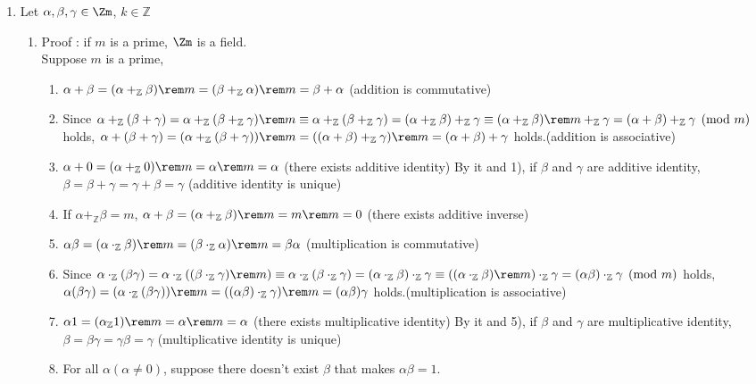 \documentclass{article}
\newcommand\Z{\mathbb Z}
\begin{document}
\begin{enumerate}[label=(\alph*)]
  \item  Let $\alpha,\beta,\gamma \in \Zm$, $k \in \mathbb{Z}$
    \begin{enumerate}[label = \arabic*']
    \item Proof : if $m$ is a prime, $\Zm$ is a field.\\
  Suppose $m$ is a prime,
\begin{enumerate}[label=\alph*)]
         \item  $\alpha + \beta = (\alpha +_\Z \beta) \rem m = (\beta +_\Z \alpha) \rem m = \beta + \alpha$ (addition is commutative)
         \item  Since $\alpha +_\Z (\beta + \gamma) = \alpha +_\Z (\beta +_\Z \gamma) \rem m \equiv \alpha +_\Z (\beta +_\Z \gamma) = (\alpha +_\Z \beta) +_\Z \gamma \equiv (\alpha +_\Z \beta) \rem m +_\Z \gamma = (\alpha + \beta) +_\Z \gamma \pmod m$ holds, $\alpha + (\beta + \gamma) = (\alpha +_\Z (\beta + \gamma)) \rem m  = ((\alpha + \beta) +_\Z \gamma) \rem m = (\alpha + \beta) + \gamma $ holds.(addition is associative)
         \item  $\alpha + 0 = (\alpha +_\Z 0) \rem m = \alpha \rem m = \alpha$ (there exists additive identity)  By it and 1), if $\beta$ and $\gamma$ are additive identity, $\beta = \beta + \gamma = \gamma + \beta = \gamma$ (additive identity is unique)
         \item  If $\alpha + _\Z\beta = m$, $\alpha + \beta = (\alpha + _\Z\beta) \rem m = m \rem m = 0$ (there exists additive inverse)
         \item  $\alpha\beta = (\alpha \cdot_\Z \beta) \rem m = (\beta \cdot_\Z \alpha) \rem m = \beta\alpha$ (multiplication is commutative)
         \item  Since $\alpha \cdot_\Z (\beta\gamma) = \alpha \cdot_\Z ((\beta \cdot_\Z \gamma) \rem m) \equiv \alpha \cdot_\Z (\beta \cdot_\Z \gamma) = (\alpha \cdot_\Z \beta) \cdot_\Z \gamma \equiv ((\alpha \cdot_\Z \beta) \rem m) \cdot_\Z \gamma = (\alpha\beta) \cdot_\Z \gamma \pmod m$ holds, $\alpha(\beta\gamma) = (\alpha \cdot_\Z (\beta\gamma)) \rem m = ((\alpha\beta)\cdot_\Z \gamma) \rem m = (\alpha\beta)\gamma$ holds.(multiplication is associative)
         \item  $\alpha1 = (\alpha _\Z1)\rem m = \alpha \rem m = \alpha$ (there exists multiplicative identity)
  By it and 5), if $\beta$ and $\gamma$ are multiplicative identity, $\beta = \beta\gamma = \gamma\beta = \gamma$ (multiplicative identity is unique)
         \item For all $\alpha (\alpha \neq 0)$, suppose there doesn't exist $\beta$ that makes $\alpha\beta = 1$.

\end{enumerate}
\end{enumerate}
\end{enumerate}
\end{document}
